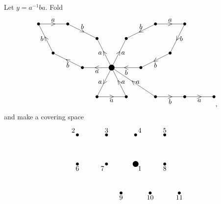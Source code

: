 \begin{example}
Let $ y = a^{-1}ba $. Fold
$$
\begin{tikzpicture}[scale=1.5]
\fill (0, 0) circle (0.1);
\fill (-0.5, -1) circle (0.05);
\fill (0.5, -1) circle (0.05);
\fill (-1, 0) circle (0.05);
\fill (-2, 0.5) circle (0.05);
\fill (-2.5, 1.5) circle (0.05);
\fill (-1.5, 1.5) circle (0.05);
\fill (-0.5, 1) circle (0.05);
\fill (0.5, 1) circle (0.05);
\fill (1.5, 1.5) circle (0.05);
\fill (2.5, 1.5) circle (0.05);
\fill (2, 0.5) circle (0.05);
\fill (1, 0) circle (0.05);
\fill (1.5, -1) circle (0.05);
\fill (2.5, -1) circle (0.05);
\fill (3.5, -1) circle (0.05);
\draw (0, 0) to node{\rotatebox{60}{$ < $}} node[left]{$ a $} (-0.5, -1);
\draw (-0.5, -1) to node{$ > $} node[below]{$ a $} (0.5, -1);
\draw (0.5, -1) to node{\rotatebox{30}{$ \wedge $}} node[right]{$ a $} (0, 0);
\draw (0, 0) to node{$ < $} node[below]{$ a $} (-1, 0);
\draw (-1, 0) to node{\rotatebox{60}{$ \wedge $}} node[below]{$ b $} (-2, 0.5);
\draw (-2, 0.5) to node{\rotatebox{30}{$ \wedge $}} node[left]{$ b $} (-2.5, 1.5);
\draw (-2.5, 1.5) to node{$ > $} node[above]{$ a $} (-1.5, 1.5);
\draw (-1.5, 1.5) to node{\rotatebox{60}{$ \vee $}} node[above]{$ b $} (-0.5, 1);
\draw (0, 0) to node{\rotatebox{30}{$ \wedge $}} node[left]{$ a $} (-0.5, 1);
\draw (0, 0) to node{\rotatebox{60}{$ > $}} node[right]{$ a $} (0.5, 1);
\draw (1.5, 1.5) to node{\rotatebox{30}{$ < $}} node[above]{$ b $} (0.5, 1);
\draw (1.5, 1.5) to node{$ > $} node[above]{$ a $} (2.5, 1.5);
\draw (2.5, 1.5) to node{\rotatebox{60}{$ < $}} node[right]{$ b $} (2, 0.5);
\draw (2, 0.5) to node{\rotatebox{30}{$ < $}} node[below]{$ b $} (1, 0);
\draw (1, 0) to node{$ < $} node[below]{$ b $} (0, 0);
\draw (1.5, -1) to node{\rotatebox{50}{$ \wedge $}} node[right]{$ a $} (0, 0);
\draw (1.5, -1) to node{$ > $} node[below]{$ b $} (2.5, -1);
\draw (2.5, -1) to node{$ > $} node[below]{$ a $} (3.5, -1);
\end{tikzpicture},
$$
and make a covering space
$$
\begin{tikzpicture}[scale=1.5]
\fill (0, 0) circle (0.1) node[below right]{$ 1 $};
\fill (-1, 0) circle (0.05) node[below left]{$ 7 $};
\fill (-0.5, -1) circle (0.05) node[below]{$ 9 $};
\fill (-2, 0) circle (0.05) node[below]{$ 6 $};
\fill (-2, 1) circle (0.05) node[above left]{$ 2 $};
\fill (-1, 1) circle (0.05) node[above]{$ 3 $};
\fill (0, 1) circle (0.05) node[above right]{$ 4 $};
\fill (1, 1) circle (0.05) node[above]{$ 5 $};
\fill (1, 0) circle (0.05) node[below]{$ 8 $};
\fill (0.5, -1) circle (0.05) node[below]{$ 10 $};
\fill (1.5, -1) circle (0.05) node[below]{$ 11 $};

\end{tikzpicture}$$
\end{example}
